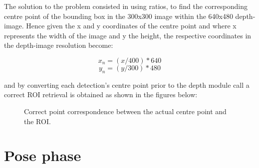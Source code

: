 The solution to the problem consisted in using ratios, to find the corresponding centre point of the bounding box in the 300x300 image within the 640x480 depth-image. Hence given the x and y coordinates of the centre point and where x represents the width of the image and y the height, the respective coordinates in the depth-image resolution become:

\[x_n = (x/400) * 640 \]
\[y_n = (y/300) * 480 \]

and by converting each detection's centre point prior to the depth module call a correct ROI retrieval is obtained as shown in the figures below:

\begin{figure}[H]
    \centering
    \qquad
    \caption{Correct point correspondence between the actual centre point and the ROI.}%
    \label{fig:ratio}%
\end{figure}

\section{Pose phase}


